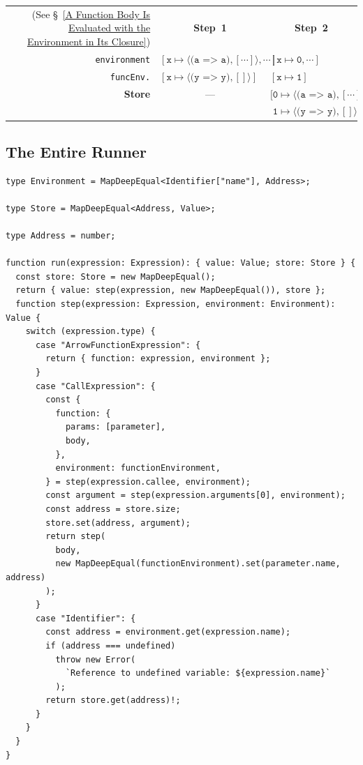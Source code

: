 \documentclass[12pt, oneside]{book}
\begin{document}
\begin{center}
\begin{tabular}{rll}
(See §~\ref{A Function Body Is Evaluated with the Environment in Its Closure}) & \multicolumn{1}{c}{\textbf{Step~1}} & \multicolumn{1}{c}{\textbf{Step~2}} \\
\texttt{environment} & $[\texttt{x} \mapsto \langle \texttt{(a => a)}, [\cdots] \rangle, \cdots]$ & $[\texttt{x} \mapsto \texttt{0}, \cdots]$ \\
\texttt{funcEnv.} & $[\texttt{x} \mapsto \langle \texttt{(y => y)}, [] \rangle]$ & $[\texttt{x} \mapsto \texttt{1}]$ \\
\textbf{Store} & \multicolumn{1}{c}{—} & $[\texttt{0} \mapsto \langle \texttt{(a => a)}, [\cdots] \rangle,$ \\
 & & $\phantom{[}\texttt{1} \mapsto \langle \texttt{(y => y)}, [] \rangle]$
\end{tabular}
\end{center}

\subsection{The Entire Runner}

\begin{verbatim}
type Environment = MapDeepEqual<Identifier["name"], Address>;

type Store = MapDeepEqual<Address, Value>;

type Address = number;

function run(expression: Expression): { value: Value; store: Store } {
  const store: Store = new MapDeepEqual();
  return { value: step(expression, new MapDeepEqual()), store };
  function step(expression: Expression, environment: Environment): Value {
    switch (expression.type) {
      case "ArrowFunctionExpression": {
        return { function: expression, environment };
      }
      case "CallExpression": {
        const {
          function: {
            params: [parameter],
            body,
          },
          environment: functionEnvironment,
        } = step(expression.callee, environment);
        const argument = step(expression.arguments[0], environment);
        const address = store.size;
        store.set(address, argument);
        return step(
          body,
          new MapDeepEqual(functionEnvironment).set(parameter.name, address)
        );
      }
      case "Identifier": {
        const address = environment.get(expression.name);
        if (address === undefined)
          throw new Error(
            `Reference to undefined variable: ${expression.name}`
          );
        return store.get(address)!;
      }
    }
  }
}
\end{verbatim}



\backmatter




\end{document}
